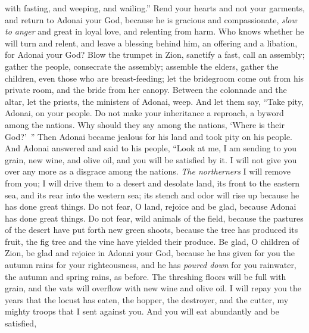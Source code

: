 \begin{biblechapter}
with fasting, and weeping, and wailing.”
\verse Rend your hearts and not your garments, 
and return to Adonai your God, 
because he is gracious and compassionate, 
\textit{slow to anger} and great in loyal love, 
and relenting from harm.
\verse Who knows whether he will turn and relent, 
and leave a blessing behind him, 
an offering and a libation, 
for Adonai your God?
\verse Blow the trumpet in Zion, 
sanctify a fast, call an assembly;
\verse gather the people, consecrate the assembly; 
assemble the elders, gather the children, 
even those who are breast-feeding; 
let the bridegroom come out from his private room, 
and the bride from her canopy.
\verse Between the colonnade and the altar, 
let the priests, the ministers of Adonai, weep. 
And let them say, “Take pity, Adonai, on your people. 
Do not make your inheritance a reproach, 
a byword among the nations. 
Why should they say among the nations, 
‘Where is their God?’ ”
 Then Adonai became jealous for his land 
and took pity on his people.
\verse And Adonai answered and said to his people, 
“Look at me, I am sending to you 
grain, new wine, and olive oil, 
and you will be satisfied by it. 
I will not give you over any more 
as a disgrace among the nations.
\verse \textit{The northerners} 
I will remove from you; 
I will drive them to a desert 
and desolate land, 
its front to the eastern sea, 
and its rear into the western sea; 
its stench and odor will rise up 
because he has done great things.
\verse Do not fear, O land, 
rejoice and be glad, 
because Adonai has done great things.
\verse Do not fear, wild animals of the field, 
because the pastures of the desert have put forth new green shoots, 
because the tree has produced its fruit, 
the fig tree and the vine 
have yielded their produce.
\verse Be glad, O children of Zion, 
be glad and rejoice in Adonai your God, 
because he has given for you 
the autumn rains for your righteousness, 
and he has \textit{poured down} for you rainwater, 
the autumn and spring rains, as before.
\verse The threshing floors will be full with grain, 
and the vats will overflow 
with new wine and olive oil.
\verse I will repay you the years 
that the locust has eaten, 
the hopper, the destroyer, and the cutter, 
my mighty troops that I sent against you.
\verse And you will eat abundantly and be satisfied, 

\end{biblechapter}
